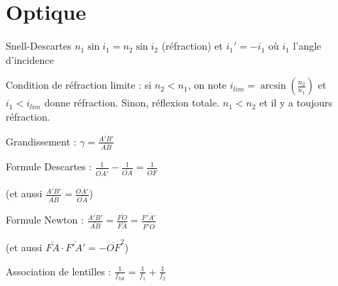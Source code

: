 \documentclass[a4paper,12pt]{book}
\begin{document}
\section{Optique}
Snell-Descartes $n_1\sin i_1 = n_2\sin i_2$ (réfraction) et $i_1'=-i_1$ où $i_1$ l'angle d'incidence
\par Condition de réfraction limite : si $n_2<n_1$, on note $i_{lim} =\arcsin\left(\frac{n_2}{n_1}\right)$ et $i_1<i_{lim}$ donne réfraction. Sinon, réflexion totale. $n_1<n_2$ et il y a toujours réfraction.
\par Grandissement : $\gamma = \frac{\overline{A'B'}}{\overline{AB}}$
\par Formule Descartes : $\frac{1}{\overline{OA'}}-\frac{1}{\overline{OA}}=\frac{1}{\overline{OF}}$ 
\par (et aussi $\frac{\overline{A'B'}}{\overline{AB}}=\frac{\overline{OA'}}{\overline{OA}}$)
\par Formule Newton : $\frac{\overline{A'B'}}{\overline{AB}}=\frac{\overline{FO}}{\overline{FA}}=\frac{\overline{F'A'}}{\overline{F'O}}$
\par (et aussi $\overline{FA}\cdot\overline{F'A'}=-\overline{OF}^2$)
\par Association de lentilles : $\frac{1}{f_{tot}}=\frac{1}{f_1}+\frac{1}{f_2}$
\end{document}
